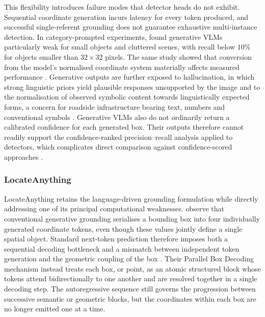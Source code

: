This flexibility introduces failure modes that detector heads do not exhibit. Sequential coordinate generation incurs latency for every token produced, and successful single-referent grounding does not guarantee exhaustive multi-instance detection. In category-prompted experiments, \citeauthor{bulzan2026unlocking} found generative \glspl{VLM} particularly weak for small objects and cluttered scenes, with recall below \(10\%\) for objects smaller than \(32\times32\) pixels. The same study showed that conversion from the model's normalised coordinate system materially affects measured performance \cite{bulzan2026unlocking}. Generative outputs are further exposed to hallucination, in which strong linguistic priors yield plausible responses unsupported by the image \cite{guan2024hallusionbench} and to the normalisation of observed symbolic content towards linguistically expected forms, a concern for roadside infrastructure bearing text, numbers and conventional symbols \cite{wang2026symbolconsistency}. Generative \glspl{VLM} also do not ordinarily return a calibrated confidence for each generated box. Their outputs therefore cannot readily support the confidence-ranked precision--recall analysis applied to detectors, which complicates direct comparison against confidence-scored approaches \cite{bulzan2026unlocking}.

\subsubsection{LocateAnything}
\label{sec:bg-locateanything}
LocateAnything retains the language-driven grounding formulation while directly addressing one of its principal computational weaknesses. \citeauthor{nvidia2026locateanything} observe that conventional generative grounding serialises a bounding box into four individually generated coordinate tokens, even though these values jointly define a single spatial object. Standard next-token prediction therefore imposes both a sequential decoding bottleneck and a mismatch between independent token generation and the geometric coupling of the box \cite{nvidia2026locateanything}. Their Parallel Box Decoding mechanism instead treats each box, or point, as an atomic structured block whose tokens attend bidirectionally to one another and are resolved together in a single decoding step. The autoregressive sequence still governs the progression between successive semantic or geometric blocks, but the coordinates within each box are no longer emitted one at a time.

